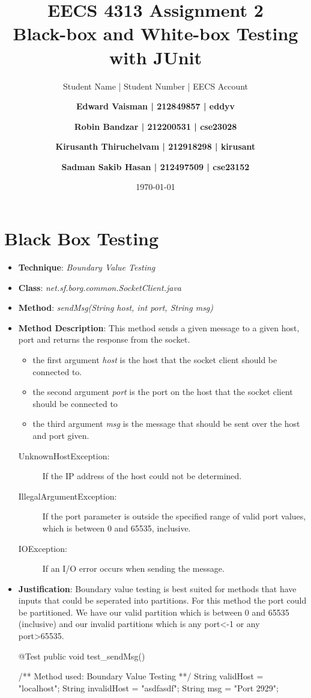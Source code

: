 \documentclass[fontsize=12pt,paper=letter,twoside]{scrartcl}
\author{Student Name | Student Number | EECS Account
\and \textbf{Edward Vaisman | 212849857 | eddyv}
\and \textbf{Robin Bandzar | 212200531 | cse23028}
\and \textbf{Kirusanth Thiruchelvam | 212918298 | kirusant}
\and \textbf{Sadman Sakib Hasan | 212497509 | cse23152}
}
\date{\today} %
\begin{document}
\title{EECS 4313 Assignment 2 \\Black-box and White-box Testing with JUnit}
\maketitle

\newpage

\tableofcontents


\newpage



\section{Black Box Testing}
\begin{itemize}
\item \textbf{Technique}: \emph{Boundary Value Testing}
\item \textbf{Class}: \emph{net.sf.borg.common.SocketClient.java}
\item \textbf{Method}: \emph{sendMsg(String host, int port, String msg)}
\item \textbf{Method Description}:
This method sends a given message to a given host, port and returns the response from the socket.
\begin{itemize}
\item the first argument \emph{host} is the host that the socket client should be connected to.
\item the second argument \emph{port} is the port on the host that the socket client should be connected to
\item the third argument \emph{msg} is the message that should be sent over the host and port given.
\end{itemize}
\begin{description}
\item[UnknownHostException:] If the IP address of the host could not be determined.
\item[IllegalArgumentException:] If the port parameter is outside the specified range of valid port values, which is between 0 and 65535, inclusive.
\item[IOException:] If an I/O error occurs when sending the message.
\end{description}
\item \textbf{Justification}: Boundary value testing is best suited for methods that have inputs that could be seperated into partitions. For this method the port could be partitioned. We have our valid partition which is between 0 and 65535 (inclusive) and our invalid partitions which is any  port\textless  -1 or any port\textgreater 65535.
\newpage
\begin{code}	@Test
	public void test_sendMsg() {
		/** Method used: Boundary Value Testing **/
		String validHost = "localhost";
		String invalidHost = "asdfasdf";
		String msg = "Port 2929";

}
\end{code}
\end{itemize}
\end{document}
